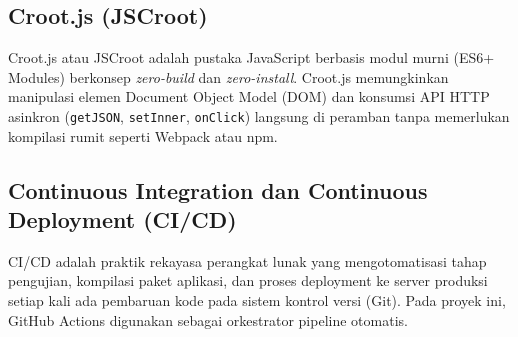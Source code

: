 \subsection{Croot.js (JSCroot)}
Croot.js atau JSCroot adalah pustaka JavaScript berbasis modul murni (ES6+ Modules) berkonsep \textit{zero-build} dan \textit{zero-install}. Croot.js memungkinkan manipulasi elemen Document Object Model (DOM) dan konsumsi API HTTP asinkron (\texttt{getJSON}, \texttt{setInner}, \texttt{onClick}) langsung di peramban tanpa memerlukan kompilasi rumit seperti Webpack atau npm.

\subsection{Continuous Integration dan Continuous Deployment (CI/CD)}
CI/CD adalah praktik rekayasa perangkat lunak yang mengotomatisasi tahap pengujian, kompilasi paket aplikasi, dan proses deployment ke server produksi setiap kali ada pembaruan kode pada sistem kontrol versi (Git). Pada proyek ini, GitHub Actions digunakan sebagai orkestrator pipeline otomatis.
